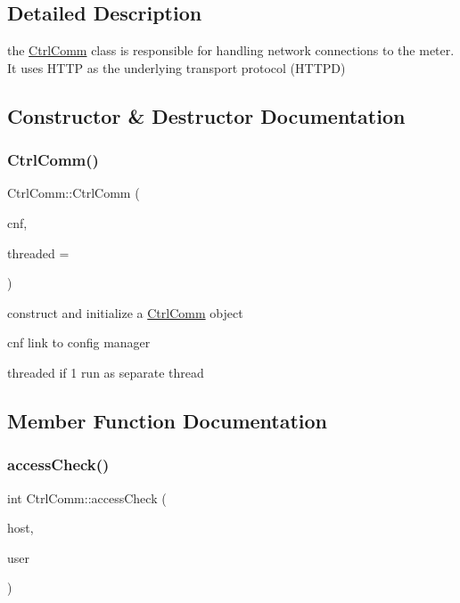\subsection{Detailed Description}
the \hyperlink{classCtrlComm}{Ctrl\+Comm} class is responsible for handling network connections to the meter. It uses H\+T\+TP as the underlying transport protocol (H\+T\+T\+PD) 

\subsection{Constructor \& Destructor Documentation}
\mbox{\label{classCtrlComm_a557582fa33a0cbc4919dbfecfd1a09ac}} 
\subsubsection{\texorpdfstring{Ctrl\+Comm()}{CtrlComm()}}
{\footnotesize\ttfamily Ctrl\+Comm\+::\+Ctrl\+Comm (\begin{DoxyParamCaption}\item[{\hyperlink{classConfigManager}{Config\+Manager} $\ast$}]{cnf,  }\item[{int}]{threaded = {} }\end{DoxyParamCaption})}



construct and initialize a \hyperlink{classCtrlComm}{Ctrl\+Comm} object 

\begin{DoxyItemize}
\item {\ttfamily cnf} link to config manager \item {\ttfamily threaded} if 1 run as separate thread \end{DoxyItemize}


\subsection{Member Function Documentation}
\mbox{\label{classCtrlComm_ac7b0ee75bc62a2fab69022e0ce1f507d}} 
\subsubsection{\texorpdfstring{access\+Check()}{accessCheck()}}
{\footnotesize\ttfamily int Ctrl\+Comm\+::access\+Check (\begin{DoxyParamCaption}\item[{char $\ast$}]{host,  }\item[{char $\ast$}]{user }\end{DoxyParamCaption})}



